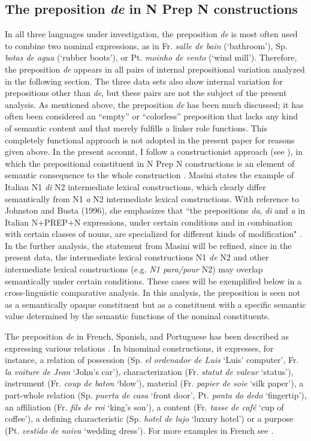 \documentclass[output=paper]{langsci/langscibook}
\begin{document}
\subsection{The preposition \textit{de} in N Prep N constructions}
In all three languages under investigation, the preposition \textit{de} is most often used to combine two nominal expressions, as in Fr. \textit{salle de bain}  (`bathroom'), Sp. \textit{botas de agua} (`rubber boots'), or Pt. \textit{moinho de vento} (`wind mill'). Therefore, the preposition \textit{de} appears in all pairs of internal prepositional variation analyzed in the following section. The three data sets also show internal variation for prepositions other than \textit{de}, but these pairs are not the subject of the present analysis. As mentioned above, the preposition \textit{de} has been much discussed; it has often been considered an ``empty'' or ``colorless'' preposition that lacks any kind of semantic content and that merely fulfills a linker role functions. This completely functional approach is not adopted in the present paper for reasons given above.
In the present account, I follow a constructionist approach (see \citealt{Masini:2009}), in which the prepositional constituent in N Prep N constructions is an element of semantic consequence to the whole construction \citep[262]{Masini:2009}. Masini states the example of Italian N1 \textit{di} N2 intermediate lexical constructions, which clearly differ semantically from N1 \textit{a} N2 intermediate lexical constructions. With reference to Johnston and Busta (1996), she emphasizes that  ``the prepositions \textit{da}, \textit{di} and \textit{a} in Italian N+PREP+N expressions, under certain conditions and in combination with certain classes of nouns, are specialized for different kinds of modification" \citep[262]{Masini:2009}. In the further analysis, the statement from Masini will be refined, since in the present data, the intermediate lexical constructions N1 \textit{de} N2 and other intermediate lexical constructions (e.g. \textit{N1 para/pour} N2) may overlap semantically under certain conditions. These cases will be exemplified below in a cross-linguistic comparative analysis. In this analysis, the preposition is seen not as a semantically opaque constituent but as a constituent with a specific semantic value determined by the semantic functions of the nominal constituents.

The preposition \textit{de} in French, Spanish, and Portuguese has been described as expressing various relations \citep[187]{Bartning:1993}. In binominal constructions, it expresses, for instance, a relation of possession (Sp. \textit{el ordenador de Luis} `Luis' computer', Fr. \textit{la voiture de Jean} `John’s car'), characterization (Fr. \textit{statut de valeur} `status'), instrument (Fr. \textit{coup de baton} `blow'), material (Fr. \textit{papier de soie} `silk paper'), a part-whole relation (Sp. \textit{puerta de casa} `front door', Pt. \textit{ponta do dedo} `fingertip'), an affiliation (Fr. \textit{fils de roi} ‘king’s son’), a content (Fr. \textit{tasse de café} `cup of coffee'), a defining characteristic (Sp. \textit{hotel de lujo} `luxury hotel') or a purpose (Pt. \textit{vestido de noiva} `wedding dress'). For more examples in French see \citet[291ff.]{Lang:1991}.
\end{document}
